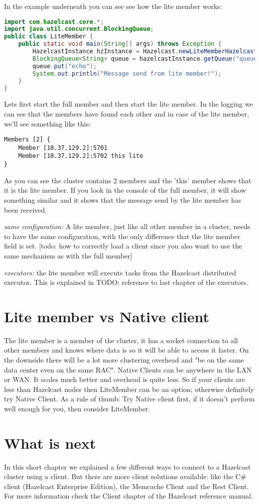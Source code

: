In the example underneath you can see see how the lite member works:
\begin{lstlisting}[language=java]
import com.hazelcast.core.*;
import java.util.concurrent.BlockingQueue;
public class LiteMember {
    public static void main(String[] args) throws Exception {
        HazelcastInstance hzInstance = Hazelcast.newLiteMemberHazelcastInstance();
        BlockingQueue<String> queue = hazelcastInstance.getQueue("queue");
        queue.put("echo");
        System.out.println("Message send from lite member!");
    }
}
\end{lstlisting}
Lets first start the full member and then start the lite member. In the logging we can see that the members have found each other and in case of the lite member, we'll see something like this:
\begin{verbatim}
Members [2] {
    Member [10.37.129.2]:5701
    Member [10.37.129.2]:5702 this lite
}	
\end{verbatim}	
As you can see the cluster contains 2 members and the 'this' member shows that it is the lite member. If you look in the console of the full member, it will show something similar and it shows that the message send by the lite member has been received.

\emph{same configuration:} A lite member, just like all other member in a cluster, needs to have the same configuration, with the only difference that the lite member field is set. [todo: how to correctly load a client since you also want to use the same mechanism as with the full member]

\emph{executors:} the lite member will execute tasks from the Hazelcast distributed executor. This is explained in TODO: reference to last chapter of the executors.

\section{Lite member vs Native client}
The lite member is a member of the cluster, it has a socket connection to all other members and knows where data is so it will be able to access it faster. On the downside there will be a lot more clustering overhead and "be on the same data center even on the same RAC". Native Clients can be anywhere in the LAN or WAN. It scales much better and overhead is quite less. So if your clients are less than Hazelcast nodes then LiteMember can be an option; otherwise definitely try Native Client. As a rule of thumb: Try Native client first, if it doesn't perform well enough for you, then consider LiteMember.

\section{What is next}
In this short chapter we explained a few different ways to connect to a Hazelcast cluster using a client. But there are more client solutions available: like the C\# client (Hazelcast Enterprise Edition), the Memcache Client and the Rest Client. For more information check the Client chapter of the Hazelcast reference manual.
